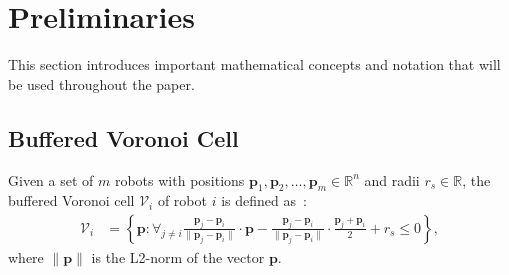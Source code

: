 \documentclass{svproc}
\newcommand{\vp}{\mathbf{p}}
\newcommand{\vf}{\mathbf{f}}
\newcommand{\vo}{\mathbf{o}}
\newcommand{\cV}{\mathcal{V}}
\newcommand{\cO}{\mathcal{O}}
\newcommand{\R}{\mathbb{R}} %
\renewcommand{\th}{^{\text{th}}}
\begin{document}



\section{Preliminaries}

This section introduces important mathematical concepts and notation that will be used throughout the paper.

\subsection{Buffered Voronoi Cell} \label{bufferedVoronoi}
Given a set of $m$ robots with positions $\vp_1,\vp_2,\ldots,\vp_m \in \R^n$ and radii $r_s \in \R$, the buffered Voronoi cell $\cV_i$ of robot $i$ is defined as~\cite{bufferedVoronoiCells}:
\begin{align}
    \cV_i &= \left\{\vp : \forall_{j\neq i} \frac{\vp_j-\vp_i}{\|\vp_j-\vp_i\|}\cdot \vp - \frac{\vp_j-\vp_i}{\|\vp_j-\vp_i\|}\cdot \frac{\vp_j+\vp_i}{2} + r_s\leq 0 \right\}, \label{voronoi_cell_definition}
\end{align}
where $\|\vp\|$ is the L2-norm of the vector $\vp$.
\end{document}
